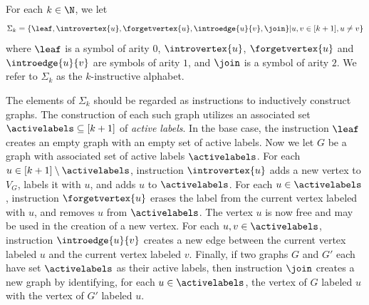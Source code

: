 \begin{definition}
For each $k \in \N$, we let
$$\Sigma_k = \{\leaf, \introvertex{u},\forgetvertex{u},\introedge{u}{v},\join\}| u,v\in [k+1],u\neq v\}$$
where $\leaf$ is a symbol of arity $0$, $\introvertex{u}$, $\forgetvertex{u}$ and $\introedge{u}{v}$ are symbols of arity $1$, and $\join$ is a symbol of arity $2$. We refer to $\Sigma_k$ as the $k$-instructive alphabet.
\end{definition}
The elements of $\Sigma_k$ should be regarded as instructions to inductively construct graphs. The construction of each such graph utilizes an associated set $\activelabels \subseteq [k+1]$ of \emph{active labels}. In the base case, the instruction $\leaf$ creates an empty graph with an empty set of active labels. Now we let $G$ be a graph with associated set of active labels $\activelabels$. For each $u \in [k+1]\setminus \activelabels$, instruction $\introvertex{u}$ adds a new vertex to $V_G$, labels it with $u$, and adds $u$ to $\activelabels$. For each $u \in \activelabels$, instruction $\forgetvertex{u}$ erases the label from the current vertex labeled with $u$, and removes $u$ from $\activelabels$. The vertex $u$ is now free and may be used in the creation of a new vertex. For each $u,v \in \activelabels$, instruction $\introedge{u}{v}$ creates a new edge between the current vertex labeled $u$ and the current vertex labeled $v$. Finally, if two graphs $G$ and $G'$ each have set $\activelabels$ as their active labels, then instruction $\join$ creates a new graph by identifying, for each $u \in \activelabels$, the vertex of $G$ labeled $u$ with the vertex of $G'$ labeled $u$. 





